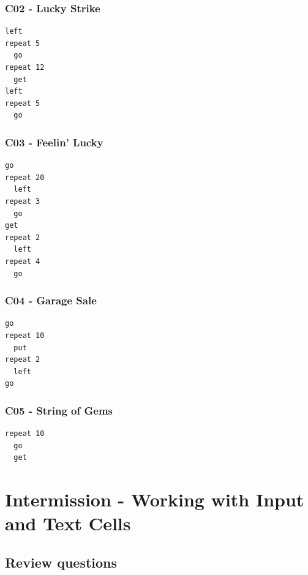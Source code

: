 \documentclass[article,A4,12pt]{llncs}
\begin{document}
\subsubsection{C02 - Lucky Strike}
\begin{verbatim}
left
repeat 5
  go
repeat 12
  get
left
repeat 5
  go
\end{verbatim}

\subsubsection{C03 - Feelin' Lucky}
\begin{verbatim}
go
repeat 20
  left
repeat 3 
  go
get
repeat 2
  left
repeat 4
  go
\end{verbatim}

\subsubsection{C04 - Garage Sale}
\begin{verbatim}
go
repeat 10
  put
repeat 2
  left
go
\end{verbatim}

\subsubsection{C05 - String of Gems}
\begin{verbatim}
repeat 10
  go
  get
\end{verbatim}


\section{Intermission - Working with Input and Text Cells}

\subsection{Review questions}
\end{document}
